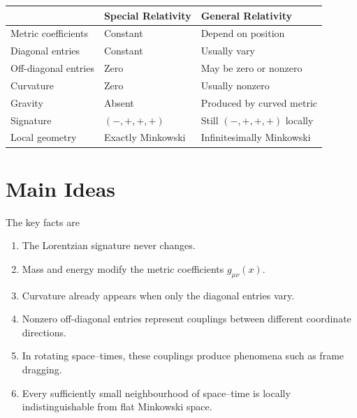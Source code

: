 \documentclass[12pt,a4paper]{article}
\theoremstyle{notespace}
\begin{document}
\begin{center}
	\begin{tabular}{|p{5cm}|p{4.2cm}|p{5.2cm}|}
		\hline
		&
		\textbf{Special Relativity}
		&
		\textbf{General Relativity}
		\\
		\hline
		
		Metric coefficients
		&
		Constant
		&
		Depend on position
		\\
		\hline
		
		Diagonal entries
		&
		Constant
		&
		Usually vary
		\\
		\hline
		
		Off-diagonal entries
		&
		Zero
		&
		May be zero or nonzero
		\\
		\hline
		
		Curvature
		&
		Zero
		&
		Usually nonzero
		\\
		\hline
		
		Gravity
		&
		Absent
		&
		Produced by curved metric
		\\
		\hline
		
		Signature
		&
		$(-,+,+,+)$
		&
		Still $(-,+,+,+)$ locally
		\\
		\hline
		
		Local geometry
		&
		Exactly Minkowski
		&
		Infinitesimally Minkowski
		\\
		\hline
		
	\end{tabular}
\end{center}


\section{Main Ideas}

The key facts are

\begin{enumerate}
	\item The Lorentzian signature never changes.
	
	\item Mass and energy modify the metric coefficients
	\(g_{\mu\nu}(x)\).
	
	\item Curvature already appears when only the diagonal entries vary.
	
	\item Nonzero off-diagonal entries represent couplings between different
	coordinate directions.
	
	\item In rotating space--times, these couplings produce phenomena such as
	frame dragging.
	
	\item Every sufficiently small neighbourhood of space--time is locally
	indistinguishable from flat Minkowski space.
\end{enumerate}
\end{document}
